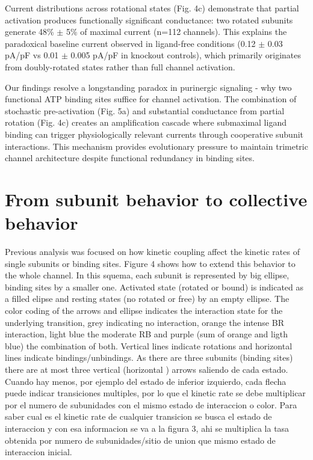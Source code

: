 \documentclass[pdflatex,sn-mathphys-num]{sn-jnl}%
\theoremstyle{thmstyleone}%
\theoremstyle{thmstyletwo}%
\theoremstyle{thmstylethree}%
\begin{document}
Current distributions across rotational states (Fig. 4c) demonstrate that partial activation produces functionally significant conductance: two rotated subunits generate 48\% $\pm$ 5\% of maximal current (n=112 channels). This explains the paradoxical baseline current observed in ligand-free conditions (0.12 $\pm$ 0.03 pA/pF vs 0.01 $\pm$ 0.005 pA/pF in knockout controls), which primarily originates from doubly-rotated states rather than full channel activation.

Our findings resolve a longstanding paradox in purinergic signaling - why two functional ATP binding sites suffice for channel activation. The combination of stochastic pre-activation (Fig. 5a) and substantial conductance from partial rotation (Fig. 4c) creates an amplification cascade where submaximal ligand binding can trigger physiologically relevant currents through cooperative subunit interactions. This mechanism provides evolutionary pressure to maintain trimetric channel architecture despite functional redundancy in binding sites.

\section{From subunit behavior to collective behavior}

Previous analysis was focused on how kinetic coupling affect the kinetic rates of single subunits or binding sites. Figure 4 shows how to extend this behavior to the whole channel. In this squema, each subunit is represented by big ellipse, binding sites by a smaller one. Activated state (rotated or bound) is indicated as a filled elipse and resting states (no rotated or free) by an empty ellipse. The color coding of the arrows and ellipse indicates the interaction state for the underlying transition, grey indicating no interaction, orange the intense BR interaction, light blue the moderate RB and purple (sum of orange and ligth blue) the combination of both.  Vertical lines indicate rotations and horizontal lines indicate bindings/unbindings. As there are three subunits (binding sites) there are at most three vertical (horizontal ) arrows saliendo de cada estado. Cuando hay menos, por ejemplo del estado de inferior izquierdo, cada flecha puede indicar transiciones multiples, por lo que el kinetic rate se debe multiplicar por el numero de subunidades con el mismo estado de interaccion o color. 
Para saber cual es el kinetic rate de cualquier transicion se busca el estado de interaccion y con esa informacion se va a la figura 3, ahi se multiplica la tasa obtenida por numero de subunidades/sitio de union que  mismo estado de interaccion 
inicial. 
\end{document}
